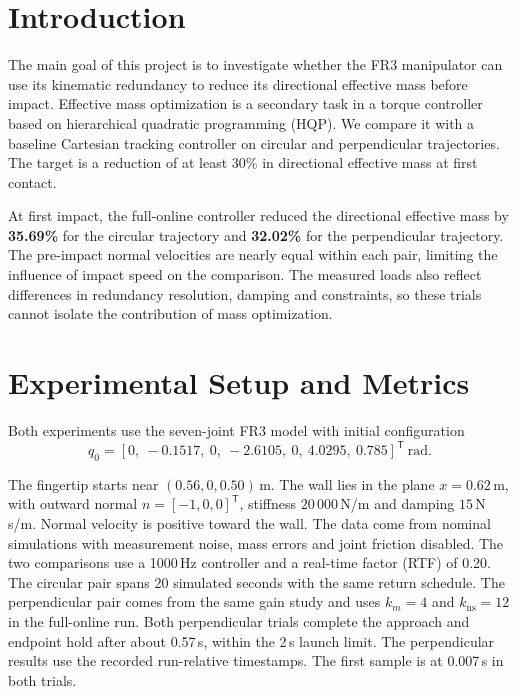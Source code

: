 \documentclass[12pt,a4paper]{article}
\begin{document}

\setcounter{page}{1}
\tableofcontents
\newpage

\section{Introduction}
The main goal of this project is to investigate whether the FR3 manipulator can use its kinematic redundancy to
reduce its directional effective mass before impact. Effective mass optimization
is a secondary task in a torque controller based on hierarchical quadratic
programming (HQP). We compare it with a baseline Cartesian tracking controller
on circular and perpendicular trajectories.
The target is a reduction of at least 30\% in directional effective mass at first contact.

At first impact, the full-online controller reduced the directional effective mass by
\textbf{35.69\%} for the circular trajectory and \textbf{32.02\%} for the
perpendicular trajectory. The pre-impact normal velocities are nearly equal within
each pair, limiting the influence of impact speed on the comparison. The measured
loads also reflect differences in redundancy resolution, damping and constraints,
so these trials cannot isolate the contribution of mass optimization.

\section{Experimental Setup and Metrics}
\label{sec:setup}
Both experiments use the seven-joint FR3 model with initial configuration
\begin{equation}
  q_0 = [0,\ -0.1517,\ 0,\ -2.6105,\ 0,\ 4.0295,\ 0.785]^{\mathsf T}\ \text{rad}.
\end{equation}

The fingertip starts near $(0.56, 0, 0.50)$\,m. The wall lies in the plane
$x = 0.62$\,m, with outward normal $n = [-1, 0, 0]^{\mathsf T}$, stiffness
$20\,000$\,N/m and damping $15$\,N\,s/m. Normal velocity is positive toward the wall.
The data come from nominal simulations with measurement noise, mass errors and
joint friction disabled. The two comparisons use a 1000\,Hz controller and a
real-time factor (RTF) of 0.20. The circular pair spans 20 simulated seconds with
the same return schedule. The perpendicular pair comes from the same gain study
and uses $k_m=4$ and $k_{\mathrm{ns}}=12$ in the full-online run. Both perpendicular trials
complete the approach and endpoint hold after about 0.57\,s, within the 2\,s launch
limit. The perpendicular results use the recorded run-relative timestamps. The
first sample is at 0.007\,s in both trials.
\end{document}
